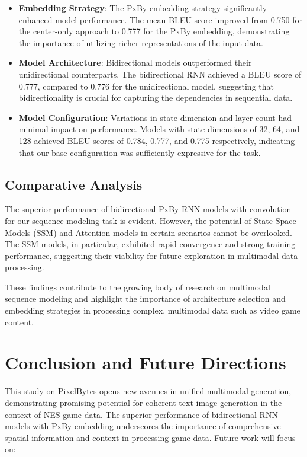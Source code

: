 \documentclass[10pt,a4paper]{article}
\begin{document}
\begin{itemize}
    \item \textbf{Embedding Strategy}: The PxBy embedding strategy significantly enhanced model performance. The mean BLEU score improved from 0.750 for the center-only approach to 0.777 for the PxBy embedding, demonstrating the importance of utilizing richer representations of the input data.
    
    \item \textbf{Model Architecture}: Bidirectional models outperformed their unidirectional counterparts. The bidirectional RNN achieved a BLEU score of 0.777, compared to 0.776 for the unidirectional model, suggesting that bidirectionality is crucial for capturing the dependencies in sequential data.
    
    \item \textbf{Model Configuration}: Variations in state dimension and layer count had minimal impact on performance. Models with state dimensions of 32, 64, and 128 achieved BLEU scores of 0.784, 0.777, and 0.775 respectively, indicating that our base configuration was sufficiently expressive for the task.
\end{itemize}

\subsection{Comparative Analysis}

The superior performance of bidirectional PxBy RNN models with convolution for our sequence modeling task is evident. However, the potential of State Space Models (SSM) and Attention models in certain scenarios cannot be overlooked. The SSM models, in particular, exhibited rapid convergence and strong training performance, suggesting their viability for future exploration in multimodal data processing.

These findings contribute to the growing body of research on multimodal sequence modeling \cite{baltrusaitis2019multimodal} and highlight the importance of architecture selection and embedding strategies in processing complex, multimodal data such as video game content.

\section{Conclusion and Future Directions}

This study on PixelBytes opens new avenues in unified multimodal generation, demonstrating promising potential for coherent text-image generation in the context of NES game data. The superior performance of bidirectional RNN models with PxBy embedding underscores the importance of comprehensive spatial information and context in processing game data. Future work will focus on:
\end{document}
